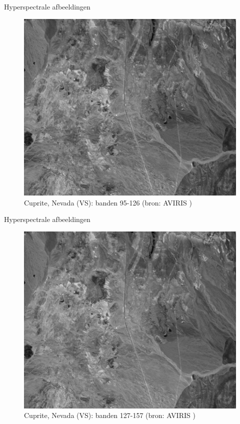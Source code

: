 \documentclass[t,12pt,dutch
\ifx\beamermode\undefined\else,\beamermode\fi
]{beamer}
\begin{document}
\begin{frame}{Hyperspectrale afbeeldingen}

\begin{figure}[H]
\centering
\includegraphics[scale=0.3]{images/cuprite_bands_95-127.png}
\caption{Cuprite, Nevada (VS): banden 95-126 (bron: AVIRIS \cite{ref:ehu_aviris_cuprite})}
\end{figure}

\end{frame}

\begin{frame}{Hyperspectrale afbeeldingen}

\begin{figure}[H]
\centering
\includegraphics[scale=0.3]{images/cuprite_bands_127-158.png}
\caption{Cuprite, Nevada (VS): banden 127-157 (bron: AVIRIS \cite{ref:ehu_aviris_cuprite})}
\end{figure}

\end{frame}
\end{document}
